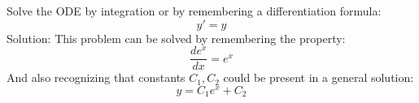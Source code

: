 \documentclass[12pt, letterpaper]{article}
\begin{document}
\setlength\parindent{0pt}
Solve the ODE by integration or by remembering a differentiation formula: 
\[ y' = y \]
Solution:
This problem can be solved by remembering the property:
\[ \frac{de^x}{dx} = e^x \]
And also recognizing that constants $C_1, C_2$ could be present in a general solution:
\[ y = C_1e^x + C_2 \]
\end{document}
